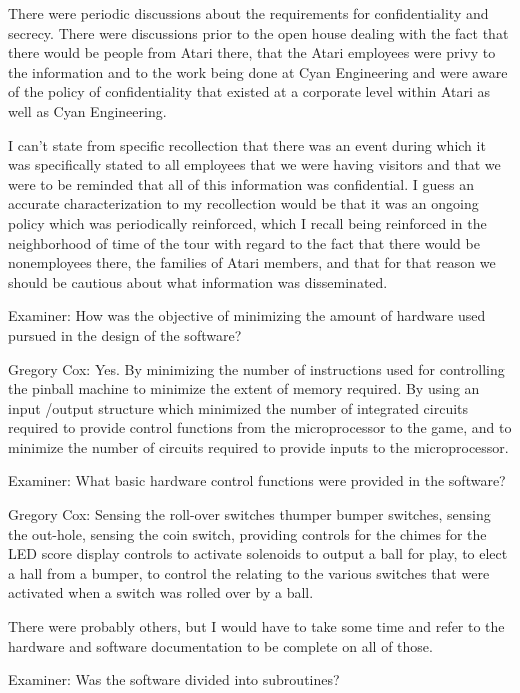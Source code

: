 There were periodic discussions about the requirements for confidentiality and secrecy. There were discussions prior to the open house dealing with the fact that there would be people from Atari there, that the Atari employees were privy to the information and to the work being done at Cyan Engineering and were aware of the policy of confidentiality that existed at a corporate level within Atari as well as Cyan Engineering. 

I can't state from specific recollection that there was an event during which it was specifically stated to all employees that we were having visitors and that we were to be reminded that all of this information was confidential. I guess an accurate characterization to my recollection would be that it was an ongoing policy which was periodically reinforced, which I recall being reinforced in the neighborhood of time of the tour with regard to the fact that there would be nonemployees there, the families of Atari members, and that for that reason we should be cautious about what information was disseminated. 

\textcolor{interviewer}{Examiner:} How was the objective of minimizing the amount of hardware used pursued in the design of the software? 

\textcolor{interviewee}{Gregory Cox:} Yes. By minimizing the number of instructions used for controlling the pinball machine to minimize the extent of memory required. By using an input /output structure which minimized the number of integrated circuits required to provide control functions from the microprocessor to the game, and to minimize the number of circuits required to provide inputs to the microprocessor. 

\textcolor{interviewer}{Examiner:} What basic hardware control functions were provided in the software? 

\textcolor{interviewee}{Gregory Cox:} Sensing the roll-over switches thumper bumper switches, sensing the out-hole, sensing the coin switch, providing controls for the chimes for the LED score display controls to activate solenoids to output a ball for play, to elect a hall from a bumper, to control the relating to the various switches that were activated when a switch was rolled over by a ball. 

There were probably others, but I would have to take some time and refer to the hardware and software documentation to be complete on all of those. 

\textcolor{interviewer}{Examiner:} Was the software divided into subroutines? 

